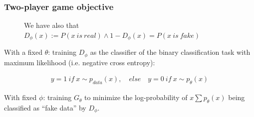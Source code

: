 \documentclass[11pt]{article}
\begin{document}
\subsubsection{Two-player game objective}

\begin{figure}[H]
    \centering
    \caption*{We have also that $D_\phi(x):=P(x\ is\ real) \wedge 1 - D_\phi(x)=P(x\ is\ fake)$}
\end{figure}

With a fixed $\theta$: training $D_\phi$ as the classifier of the binary classification task with maximum likelihood (i.e. negative cross entropy):

\begin{gather}
    y = 1\ if\ x\sim p_{data}(x), \quad else\quad y=0\ if\ x \sim p_\theta(x)
\end{gather}

With fixed $\phi$: training $G_\theta$ to minimize the log-probability of $x \sum p_\theta(x)$ being classified as ``fake data'' by $D_\phi$.
\end{document}
